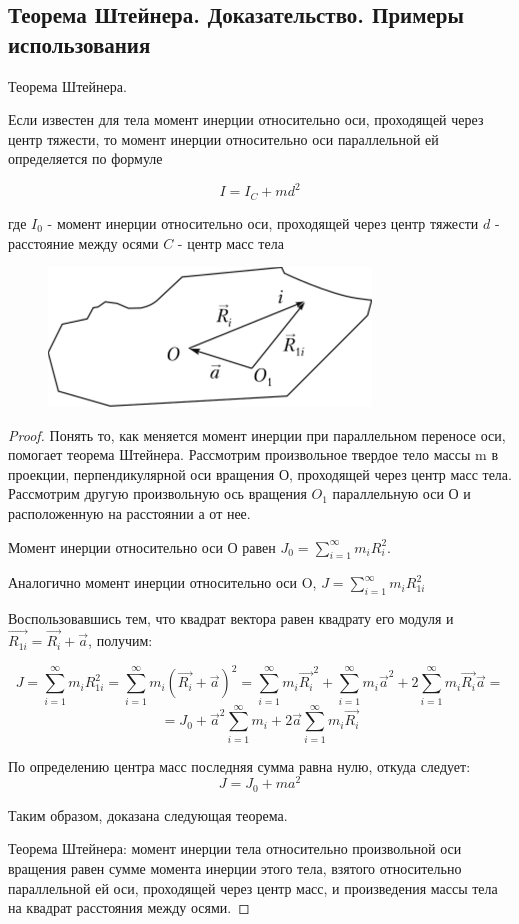 \subsection{Теорема Штейнера. Доказательство. Примеры использования}

\begin{theorem}
    Теорема Штейнера.

    Если известен для тела момент инерции относительно оси, проходящей через центр тяжести, то момент инерции относительно оси параллельной ей определяется по формуле

    $$I=I_C+md^2$$

    где $I_0$ - момент инерции относительно оси, проходящей через центр тяжести
    $d$ - расстояние между осями
    $C$ - центр масс тела
\end{theorem}

\begin{figure}[h]
    \centering
    \includegraphics[width=0.5\linewidth]{imgs/q10i2.png}
\end{figure}

\begin{proof}
    Понять то, как меняется момент инерции при параллельном переносе оси, помогает теорема Штейнера. 
Рассмотрим произвольное твердое тело массы m в проекции, перпендикулярной оси вращения О, 
проходящей через центр масс тела. Рассмотрим другую произвольную ось вращения $O_1$ параллельную оси О 
и расположенную на расстоянии а от нее.

Момент инерции относительно оси О равен $J_0 = \sum\limits_{i=1}^\infty m_iR_i^2$.

Аналогично момент инерции относительно оси O, $J = \sum\limits_{i=1}^\infty m_iR_{1i}^2$

Воспользовавшись тем, что квадрат вектора равен квадрату его модуля и $\vec{R_{1i}}=\vec{R_i} + \vec{a}$, получим:

$$J 
= \sum\limits_{i=1}^\infty m_iR_{1i}^2 
= \sum\limits_{i=1}^\infty m_i(\vec{R_{i}} + \vec{a})^2
= \sum\limits_{i=1}^\infty m_i\vec{R_{i}}^2 + \sum\limits_{i=1}^\infty m_i\vec{a}^2 + 2\sum\limits_{i=1}^\infty m_i\vec{R_{i}}\vec{a} 
= 
$$
$$
= J_0 + \vec{a}^2\sum\limits_{i=1}^\infty m_i + 2\vec{a}\sum\limits_{i=1}^\infty m_i \vec{R_i}
$$

По определению центра масс последняя сумма равна нулю, откуда следует: 
$$J = J_0 + ma^2$$

Таким образом, доказана следующая теорема.

Теорема Штейнера: момент инерции тела относительно произвольной оси вращения равен сумме момента инерции этого тела, 
взятого относительно параллельной ей оси, проходящей через центр масс, и произведения массы тела на квадрат расстояния 
между осями.
\end{proof}

